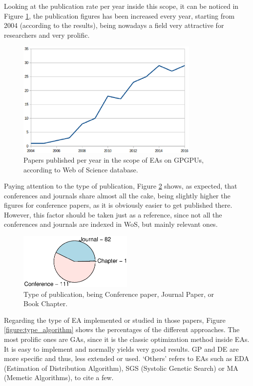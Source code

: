 \documentclass{article}
\begin{document}
Looking at the publication rate per year inside this scope, it can be noticed in Figure \ref{figure:publications}, the publication figures has been increased  every year, starting from 2004 (according to the results), being nowadays a field very attractive for researchers and very prolific.

\begin{figure}[!ht]
\centering
\includegraphics[width=0.8\textwidth]{years.eps}
\caption{Papers published per year in the scope of EAs on GPGPUs, according to Web of Science database.}
\label{figure:publications}
\end{figure}


Paying attention to the type of publication, Figure \ref{figure:type_publication} shows, as expected, that conferences and journals share almost all the cake, being slightly higher the figures for conference papers, as it is obviously easier to get published there. However, this factor should be taken just as a reference, since not all the conferences and journals are indexed in WoS, but mainly relevant ones.

\begin{figure}[!ht]
\centering
\includegraphics[clip,trim=16 64 16 64,width=0.5\textwidth]{papertype.eps}
\caption{Type of publication, being Conference paper, Journal Paper, or Book Chapter.}
\label{figure:type_publication}
\end{figure}

Regarding the type of EA implemented or studied in those papers, Figure \ref{figure:type_algorithm} shows the percentages of the different approaches. The most prolific ones are GAs, since it is the classic optimization method inside EAs. It is easy to implement and normally yields very good results.  GP and DE are more specific and thus, less extended or used. `Others' refers to EAs such as EDA (Estimation of Distribution Algorithm), SGS (Systolic Genetic Search) or MA (Memetic Algorithms), to cite a few.
\end{document}
